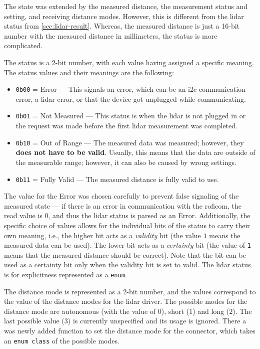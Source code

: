 \documentclass[
  digital,     %
  oneside,     %
  nosansbold,  %
  nocolorbold, %
  nolof,         %
  nolot,         %
]{fithesis4}
\begin{document}
{{{The state was extended by the measured distance, the measurement status and setting, and receiving distance modes. However, this is different from the \acrshort{lidar} status from \autoref{sec:lidar-result}. Whereas, the measured distance is just a 16-bit number with the measured distance in millimeters, the status is more complicated.

The status is a 2-bit number, with each value having assigned a specific meaning. The status values and their meanings are the following:
\begin{itemize}
    \item \lstinline|0b00| = Error --- This signals an error, which can be an \acrshort{i2c} communication error, a \acrshort{lidar} error, or that the device got unplugged while communicating.  
    \item \lstinline|0b01| = Not Measured --- This status is when the \acrshort{lidar} is not plugged in or the request was made before the first \acrshort{lidar} measurement was completed.
    \item \lstinline|0b10| = Out of Range --- The measured data was measured; however, they \textbf{does not have to be valid}. Usually, this means that the data are outside of the measurable range; however, it can also be caused by wrong settings.
    \item \lstinline|0b11| = Fully Valid --- The measured distance is fully valid to use.
\end{itemize}

The value for the Error was chosen carefully to prevent false signaling of the measured state --- if there is an error in communication with the \acrshort{roficom}, the read value is $0$, and thus the \acrshort{lidar} status is parsed as an Error. Additionally, the specific choice of values allows for the individual bits of the status to carry their own meaning, i.e., the higher bit acts as a \emph{validity} bit (the value \verb|1| means the measured data can be used). The lower bit acts as a \emph{certainty} bit (the value of \verb|1| means that the measured distance should be correct). Note that the bit can be used as a certainty bit only when the validity bit is set to valid. The \acrshort{lidar} status is for explicitness represented as a \lstinline|enum|.

The distance mode is represented as a 2-bit number, and the values correspond to the value of the distance modes for the \acrshort{lidar} driver. The possible modes for the distance mode are autonomous (with the value of $0$), short ($1$) and long ($2$). The last possible value ($3$) is currently unspecified and its usage is ignored. There a was newly added function to set the distance mode for the connector, which takes an \lstinline|enum class| of the possible modes.

}}}
\end{document}
